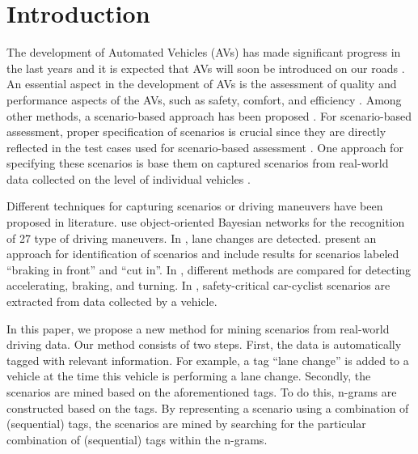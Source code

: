 \section{Introduction}
\label{sec:introduction}

\cstarta
The development of Automated Vehicles (AVs) has made significant progress in the last years and it is expected that AVs will soon be introduced on our roads \autocite{bimbraw2015autonomous, madni2018autonomous}. 
An essential aspect in the development of AVs is the assessment of quality and performance aspects of the AVs, such as safety, comfort, and efficiency \autocite{bengler2014threedecades, stellet2015taxonomy}. 
Among other methods, a scenario-based approach has been proposed \autocite{elrofai2018scenario, putz2017pegasus}. 
For scenario-based assessment, proper specification of scenarios is crucial since they are directly reflected in the test cases used for scenario-based assessment \autocite{stellet2015taxonomy}. 
One approach for specifying these scenarios is base them on captured scenarios from real-world data collected on the level of individual vehicles \autocite{elrofai2018scenario, putz2017pegasus, roesener2016scenariobased, deGelder2017assessment}. 

Different techniques for capturing scenarios or driving maneuvers have been proposed in literature. 
\textcite{kasper2012oobayesnetworks} use object-oriented Bayesian networks for the recognition of 27 type of driving maneuvers. 
In \autocite{krajewski2018highD, schlechtriemen2015lanechange}, lane changes are detected. \textcite{paardekooper2019dataset6000km} present an approach for identification of scenarios and include results for scenarios labeled ``braking in front'' and ``cut in''. 
In \cite{xie2017driving}, different methods are compared for detecting accelerating, braking, and turning.
In \autocite{cara2015carcyclist}, safety-critical car-cyclist scenarios are extracted from data collected by a vehicle.

In this paper, we propose a new method for mining scenarios from real-world driving data. 
Our method consists of two steps. First, the data is automatically tagged with relevant information. For example, a tag ``lane change'' is added to a vehicle at the time this vehicle is performing a lane change. Secondly, the scenarios are mined based on the aforementioned tags. To do this, n-grams are constructed based on the tags. By representing a scenario using a combination of (sequential) tags, the scenarios are mined by searching for the particular combination of (sequential) tags within the n-grams.

